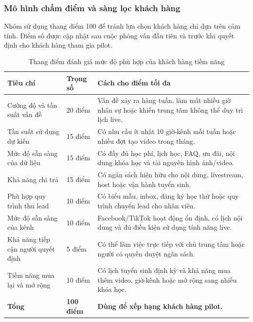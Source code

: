\subsubsection{Mô hình chấm điểm và sàng lọc khách hàng}

Nhóm sử dụng thang điểm 100 để tránh lựa chọn khách hàng chỉ dựa trên cảm tính.
Điểm số được cập nhật sau cuộc phỏng vấn đầu tiên và trước khi quyết định cho
khách hàng tham gia pilot.

\begin{table}[H]
    \centering
    \small
    \setlength{\tabcolsep}{4pt}
    \renewcommand{\arraystretch}{1.22}
    \caption{Thang điểm đánh giá mức độ phù hợp của khách hàng tiềm năng}
    \label{tab:icp-scoring-model}
    \begin{tabularx}{\linewidth}{@{}L{3.3cm}L{1.6cm}Y@{}}
        \toprule
        \textbf{Tiêu chí} & \textbf{Trọng số} & \textbf{Cách cho điểm tối đa} \\ \midrule
        Cường độ và tần suất vấn đề & 20 điểm & Vấn đề xảy ra hàng tuần, làm mất
        nhiều giờ nhân sự hoặc khiến trung tâm không thể duy trì lịch live. \\
        Tần suất sử dụng dự kiến & 15 điểm & Có nhu cầu ít nhất 10 giờ-kênh mỗi
        tuần hoặc nhiều đợt tạo video trong tháng. \\
        Mức độ sẵn sàng của dữ liệu & 15 điểm & Có đầy đủ học phí, lịch học,
        FAQ, ưu đãi, nội dung khóa học và tài nguyên hình ảnh/video. \\
        Khả năng chi trả & 15 điểm & Có ngân sách hiện hữu cho nội dung,
        livestream, host hoặc vận hành tuyển sinh. \\
        Phù hợp quy trình thu lead & 10 điểm & Có biểu mẫu, inbox, đăng ký học
        thử hoặc quy trình chuyển lead cho nhân viên. \\
        Mức độ sẵn sàng của kênh & 10 điểm & Facebook/TikTok hoạt động ổn định,
        có lịch nội dung và đủ điều kiện sử dụng tính năng live. \\
        Khả năng tiếp cận người quyết định & 5 điểm & Có thể làm việc trực tiếp
        với chủ trung tâm hoặc người có quyền duyệt ngân sách. \\
        Tiềm năng mua lại và mở rộng & 10 điểm & Có lịch tuyển sinh định kỳ và
        khả năng mua thêm video, giờ-kênh hoặc mở rộng sang nhiều khóa học. \\
        \midrule
        \textbf{Tổng} & \textbf{100 điểm} & \textbf{Dùng để xếp hạng khách hàng pilot.} \\ \bottomrule
    \end{tabularx}
\end{table}

